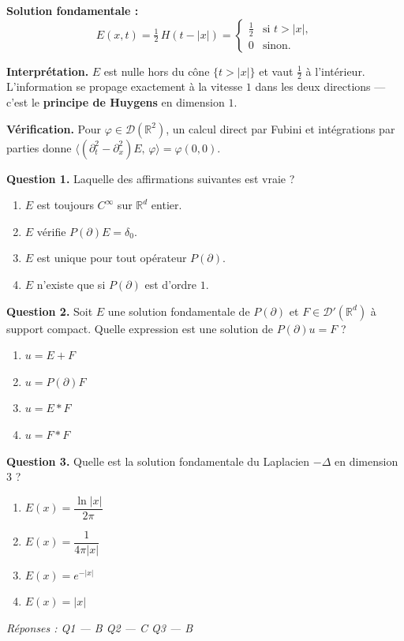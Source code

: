 \documentclass[12pt,a4paper]{article}
\newenvironment{exemple}[1]{%
  \begin{tcolorbox}[enhanced, breakable,
    colback=GrisClair, colframe=GrisMoyen,
    fonttitle=\bfseries\sffamily, title={Exemple — #1},
    left=6pt, right=6pt, top=4pt, bottom=4pt, arc=3pt]
}{%
  \end{tcolorbox}}
\newenvironment{qcm}{%
  \begin{tcolorbox}[enhanced, breakable,
    colback=white, colframe=black,
    fonttitle=\bfseries\sffamily, title={QCM},
    arc=0pt, left=6pt, right=6pt, top=4pt, bottom=4pt]
}{%
  \end{tcolorbox}}
\newcommand{\R}{\mathbb{R}}
\newcommand{\br}[2]{\langle #1,\, #2 \rangle}
\begin{document}
\begin{exemple}{Équation des ondes en dimension $1+1$ : $\partial_t^2 u - \partial_x^2 u = f$}
\textbf{Solution fondamentale :}
\[
  E(x,t) = \tfrac{1}{2}\,H(t - |x|)
  = \begin{cases} \tfrac{1}{2} & \text{si } t > |x|, \\ 0 & \text{sinon.} \end{cases}
\]

\textbf{Interprétation.} $E$ est nulle hors du cône $\{t > |x|\}$ et vaut $\tfrac{1}{2}$
à l'intérieur. L'information se propage exactement à la vitesse $1$ dans les deux
directions — c'est le \textbf{principe de Huygens} en dimension $1$.

\medskip
\textbf{Vérification.} Pour $\varphi \in \mathcal{D}(\R^2)$, un calcul direct par
Fubini et intégrations par parties donne
$\br{(\partial_t^2 - \partial_x^2)E}{\varphi} = \varphi(0,0)$.
\end{exemple}

\bigskip
\begin{qcm}
\textbf{Question 1.} Laquelle des affirmations suivantes est vraie ?
\begin{enumerate}[label=\Alph*., itemsep=2pt]
  \item $E$ est toujours $C^\infty$ sur $\R^d$ entier.
  \item $E$ vérifie $P(\partial)E = \delta_0$.
  \item $E$ est unique pour tout opérateur $P(\partial)$.
  \item $E$ n'existe que si $P(\partial)$ est d'ordre $1$.
\end{enumerate}

\medskip
\textbf{Question 2.} Soit $E$ une solution fondamentale de $P(\partial)$ et
$F \in \mathcal{D}'(\R^d)$ à support compact. Quelle expression est une solution
de $P(\partial)u = F$ ?
\begin{enumerate}[label=\Alph*., itemsep=2pt]
  \item $u = E + F$
  \item $u = P(\partial)F$
  \item $u = E * F$
  \item $u = F * F$
\end{enumerate}

\medskip
\textbf{Question 3.} Quelle est la solution fondamentale du Laplacien $-\Delta$
en dimension $3$ ?
\begin{enumerate}[label=\Alph*., itemsep=2pt]
  \item $E(x) = \dfrac{\ln|x|}{2\pi}$
  \item $E(x) = \dfrac{1}{4\pi|x|}$
  \item $E(x) = e^{-|x|}$
  \item $E(x) = |x|$
\end{enumerate}

\smallskip
\textit{\color{GrisMoyen}Réponses : Q1 — B \quad Q2 — C \quad Q3 — B}
\end{qcm}
\end{document}
